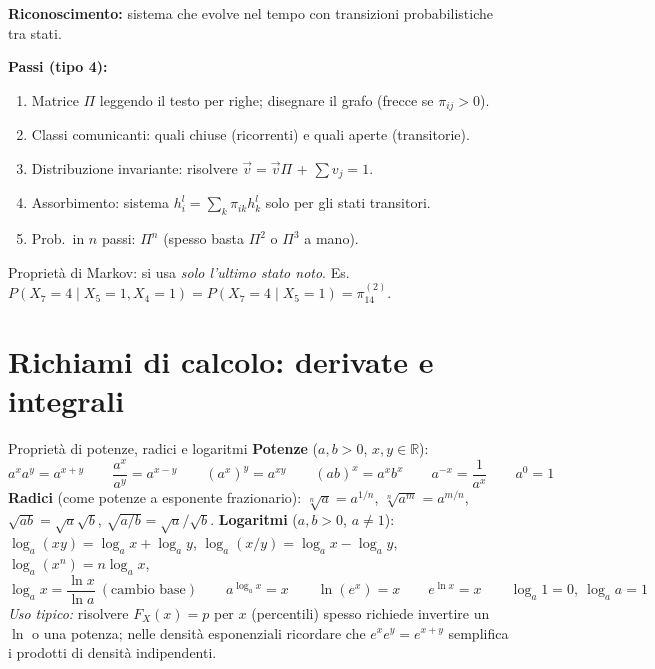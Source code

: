 \documentclass[11pt]{article}
\begin{document}
\begin{trucco}
\textbf{Riconoscimento:} sistema che evolve nel tempo con transizioni probabilistiche tra stati.

\textbf{Passi (tipo 4):}
\begin{enumerate}[leftmargin=1.4em,itemsep=1pt,topsep=2pt]
\item Matrice $\Pi$ leggendo il testo per righe; disegnare il grafo (frecce se $\pi_{ij}>0$).
\item Classi comunicanti: quali chiuse (ricorrenti) e quali aperte (transitorie).
\item Distribuzione invariante: risolvere $\vec v=\vec v\Pi$ + $\sum v_j=1$.
\item Assorbimento: sistema $h_i^l=\sum_k\pi_{ik}h_k^l$ solo per gli stati transitori.
\item Prob.\ in $n$ passi: $\Pi^n$ (spesso basta $\Pi^2$ o $\Pi^3$ a mano).
\end{enumerate}
\end{trucco}

\begin{attenzione}
Propriet\`a di Markov: si usa \emph{solo l'ultimo stato noto}. Es.\ $P(X_7{=}4\mid X_5{=}1,X_4{=}1)=P(X_7{=}4\mid X_5{=}1)=\pi_{14}^{(2)}$.
\end{attenzione}


\newpage
\section{Richiami di calcolo: derivate e integrali}

\begin{concetto}[barSlate]{Propriet\`a di potenze, radici e logaritmi}
\textbf{Potenze} ($a,b>0$, $x,y\in\mathbb{R}$):
\[ a^x a^y = a^{x+y} \qquad \frac{a^x}{a^y}=a^{x-y} \qquad (a^x)^y=a^{xy} \qquad (ab)^x=a^x b^x \qquad a^{-x}=\frac{1}{a^x} \qquad a^0=1 \]
\textbf{Radici} (come potenze a esponente frazionario): $\sqrt[n]{a}=a^{1/n}$, \quad $\sqrt[n]{a^m}=a^{m/n}$, \quad $\sqrt{ab}=\sqrt a\sqrt b$, \quad $\sqrt{a/b}=\sqrt a/\sqrt b$.
\textbf{Logaritmi} ($a,b>0$, $a\neq1$): $\log_a(xy)=\log_a x+\log_a y$, \; $\log_a(x/y)=\log_a x-\log_a y$, \; $\log_a(x^n)=n\log_a x$,
\[ \log_a x = \frac{\ln x}{\ln a}\ (\text{cambio base}) \qquad a^{\log_a x}=x \qquad \ln(e^x)=x \qquad e^{\ln x}=x \qquad \log_a 1 = 0,\ \log_a a = 1 \]
\emph{Uso tipico:} risolvere $F_X(x)=p$ per $x$ (percentili) spesso richiede invertire un $\ln$ o una potenza; nelle densit\`a esponenziali ricordare che $e^{x}e^{y}=e^{x+y}$ semplifica i prodotti di densit\`a indipendenti.
\end{concetto}
\end{document}
